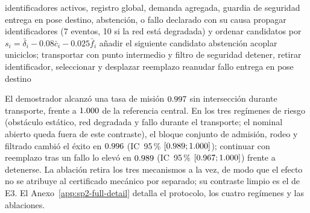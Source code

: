 \begin{algorithm}[!htbp]
\caption{Demostrador Cargo híbrido: selección, acoplamiento, transporte y sustitución}
\label{alg:cargo-hibrido-compact}
\begin{algorithmic}[1]
\Require identificadores activos, registro global, demanda agregada, guardia de seguridad
\Ensure entrega en pose destino, abstención, o fallo declarado con su causa
\State propagar identificadores (7 eventos, 10 si la red está degradada) y ordenar candidatos por $s_i=\bar\delta_i-0.08\bar c_i-0.025\bar f_i$
  \State añadir el siguiente candidato
\EndWhile
{}
  \State \Return abstención
\EndIf
\State acoplar uniciclos; transportar con punto intermedio y filtro de seguridad
  \State detener, retirar identificador, seleccionar y desplazar reemplazo
    \State reanudar
  \Else
    \State \Return fallo
  \EndIf
\EndIf
\State \Return entrega en pose destino
\end{algorithmic}
\end{algorithm}

\begin{table}[!htbp]
  \centering
  \caption{Demostrador Cargo híbrido: resultados agregados de los seis tratamientos.}
  \label{tab:sp2-compact-cargo-results}
  \small
  \resizebox{\textwidth}{!}{}
  \viuownsource
\end{table}

El demostrador alcanzó una tasa de misión $0.997$ sin
intersección durante transporte, frente a $1.000$ de la
referencia central. En los tres regímenes de riesgo (obstáculo estático, red
degradada y fallo durante el transporte; el nominal abierto queda fuera de
este contraste), el bloque conjunto de admisión, rodeo y filtrado cambió el
éxito en $0.996$ (IC~95\,\% $[0.989;1.000]$); continuar
con reemplazo tras un fallo lo elevó en $0.989$
(IC~95\,\% $[0.967;1.000]$) frente a detenerse. La ablación retira los
tres mecanismos a la vez, de modo que el efecto no se atribuye al certificado
mecánico por separado; su contraste limpio es el de E3. El
Anexo~\ref{app:sp2-full-detail} detalla el protocolo, los cuatro regímenes y
las ablaciones.

